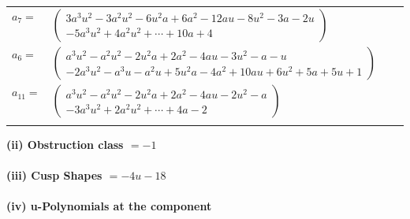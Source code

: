 \documentclass[1p]{elsarticle_modified}
\theoremstyle{definition}
\begin{document}
\begin{tabular}{m{7pt} m{180pt} m{7pt} m{180pt} }
\flushright $a_{7}=$&$\begin{pmatrix}3 a^3 u^2-3 a^2 u^2-6 u^2 a+6 a^2-12 a u-8 u^2-3 a-2 u\\-5 a^3 u^2+4 a^2 u^2+\cdots+10 a+4\end{pmatrix}$ \\
\flushright $a_{6}=$&$\begin{pmatrix}a^3 u^2- a^2 u^2-2 u^2 a+2 a^2-4 a u-3 u^2- a- u\\-2 a^3 u^2- a^3 u- a^2 u+5 u^2 a-4 a^2+10 a u+6 u^2+5 a+5 u+1\end{pmatrix}$ \\
\flushright $a_{11}=$&$\begin{pmatrix}a^3 u^2- a^2 u^2-2 u^2 a+2 a^2-4 a u-2 u^2- a\\-3 a^3 u^2+2 a^2 u^2+\cdots+4 a-2\end{pmatrix}$\\&\end{tabular}
\flushleft \textbf{(ii) Obstruction class $= -1$}\\~\\
\flushleft \textbf{(iii) Cusp Shapes $= -4 u-18$}\\~\\
\newpage\renewcommand{\arraystretch}{1}
\flushleft \textbf{(iv) u-Polynomials at the component}\newline \\
\end{document}
